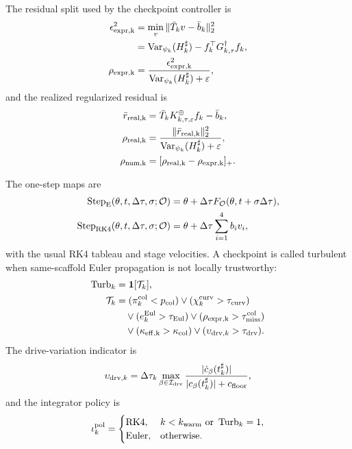 \documentclass[
  reprint,
  amsmath,
  amssymb,
  aps,
  pra,
  nofootinbib,
  superscriptaddress,
  floatfix
]{revtex4-2}
\newcommand{\Oset}{\mathcal{O}}
\newcommand{\drv}{\mathrm{drv}}
\newcommand{\Var}{\operatorname{Var}}
\newcommand{\eps}{\varepsilon}
\begin{document}
The residual split used by the checkpoint controller is
\begin{equation}
\begin{aligned}
\epsilon_{\rm expr,k}^2
&=\min_v\|\bar T_kv-\bar b_k\|_2^2\\
&=\Var_{\psi_k}(H_k^\sharp)-f_k^\top G_{k,\tau}^\dagger f_k,\\
\rho_{\rm expr,k}
&=\frac{\epsilon_{\rm expr,k}^2}{\Var_{\psi_k}(H_k^\sharp)+\eps},
\end{aligned}
\label{eq:expr_miss}
\end{equation}
and the realized regularized residual is
\begin{equation}
\begin{aligned}
\bar r_{\rm real,k}&=\bar T_kK_{k,\tau,\eps}^{\oplus}f_k-\bar b_k,\\
\rho_{\rm real,k}&=\frac{\|\bar r_{\rm real,k}\|_2^2}{\Var_{\psi_k}(H_k^\sharp)+\eps},\\
\rho_{\rm num,k}&=[\rho_{\rm real,k}-\rho_{\rm expr,k}]_+ .
\end{aligned}
\label{eq:num_miss}
\end{equation}

The one-step maps are
\begin{equation}
\begin{aligned}
\operatorname{Step}_{\rm E}(\theta,t,\Delta\tau,\sigma;\Oset)
&=\theta+\Delta\tau F_{\Oset}(\theta,t+\sigma\Delta\tau),\\
\operatorname{Step}_{\rm RK4}(\theta,t,\Delta\tau,\sigma;\Oset)
&=\theta+\Delta\tau\sum_{i=1}^4 b_i v_i ,
\end{aligned}
\label{eq:step_maps}
\end{equation}
with the usual RK4 tableau and stage velocities. A checkpoint is called turbulent when same-scaffold Euler propagation is not locally trustworthy:
\begin{equation}
\begin{aligned}
\operatorname{Turb}_k&=\mathbf 1[\mathcal T_k],\\
\mathcal T_k&=
(\pi_k^{\rm col}<p_{\rm col})
\vee(\chi_k^{\rm curv}>\tau_{\rm curv})\\
&\quad\vee(e_k^{\rm Eul}>\tau_{\rm Eul})
\vee(\rho_{\rm expr,k}>\tau_{\rm miss}^{\rm col})\\
&\quad\vee(\kappa_{\rm eff,k}>\kappa_{\rm col})
\vee(\upsilon_{\drv,k}>\tau_{\drv}) .
\end{aligned}
\label{eq:turbulent_period}
\end{equation}
The drive-variation indicator is
\begin{equation}
\upsilon_{\drv,k}=\Delta\tau_k
\max_{\beta\in\mathcal I_{\drv}}
\frac{|\dot c_\beta(t_k^\sharp)|}{|c_\beta(t_k^\sharp)|+c_{\rm floor}},
\label{eq:drive_variation}
\end{equation}
and the integrator policy is
\begin{equation}
\iota_k^{\rm pol}=
\begin{cases}
{\rm RK4},& k<k_{\rm warm}\ \text{or}\ \operatorname{Turb}_k=1,\\
{\rm Euler},&\text{otherwise.}
\end{cases}
\label{eq:integrator_policy}
\end{equation}
\end{document}
